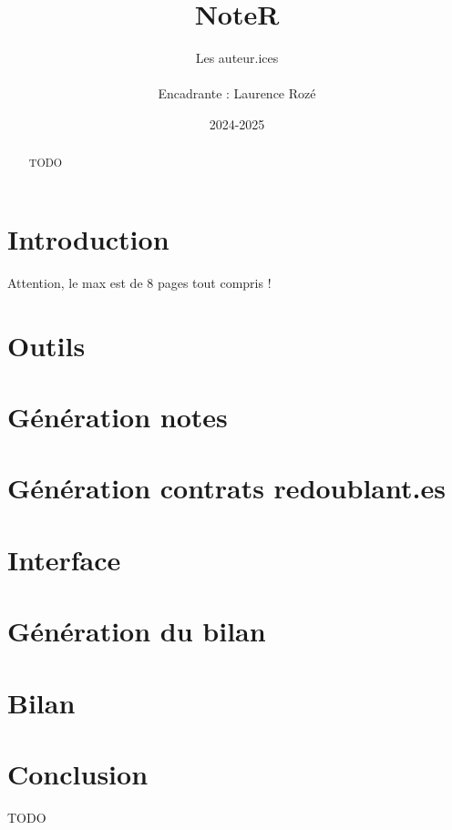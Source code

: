 \documentclass[a4paper,11pt]{article}
\title{\textbf{NoteR}}
\author{Les auteur.ices
	\\ \\
	Encadrante : Laurence Rozé}
\date{2024-2025}                    %
\begin{document}
  \maketitle %



\begin{abstract}
TODO
\end{abstract}

\section*{Introduction}
	Attention, le max est de 8 pages tout compris !

\section{Outils}
  
\section{Génération notes }	

\section{Génération contrats redoublant.es}
  

\section{Interface }

\section{Génération du bilan }
 

\section{Bilan }
  

\section*{Conclusion}
TODO


\end{document}
